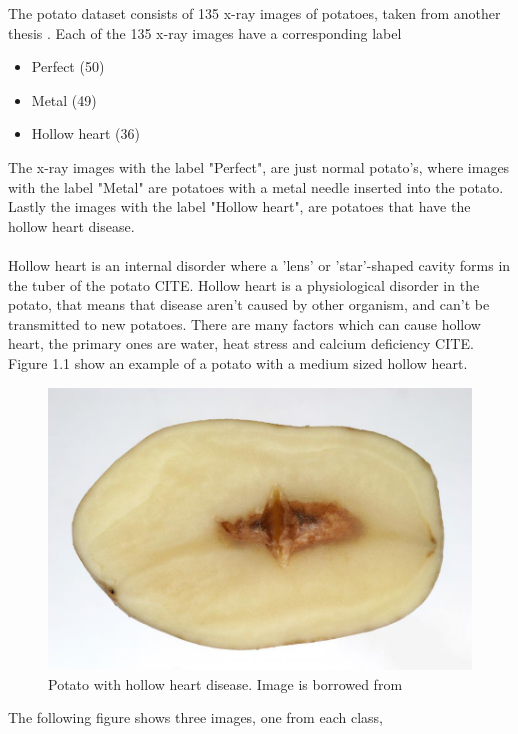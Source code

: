 \documentclass[11pt]{article}
\begin{document}
The potato dataset consists of 135 x-ray images of potatoes, taken from another thesis \cite{Online_Inspection_of_X-ray_Images}. Each of the 135 x-ray images have a corresponding label
\begin{itemize}
    \item Perfect (50)
    \item Metal (49)
    \item Hollow heart (36)
\end{itemize}
The x-ray images with the label "Perfect", are just normal potato's, where images with the label "Metal" are potatoes with a metal needle inserted into the potato. Lastly the images with the label "Hollow heart", are potatoes that have the hollow heart disease. 
\\ \\
Hollow heart is an internal disorder where a 'lens' or 'star'-shaped cavity forms in the tuber of the potato CITE. Hollow heart is a physiological disorder in the potato, that means that disease aren't caused by other organism, and can't be transmitted to new potatoes. 
There are many factors which can cause hollow heart, the primary ones are water, heat stress and calcium deficiency CITE. Figure 1.1 show an example of a potato with a medium sized hollow heart.
\begin{figure}[!h]\label{fig:hollow_heart}
    \centering
    \includegraphics[scale=0.2]{figurer/potato_experiment/Hollow_heart.jpg}
    \caption{Potato with hollow heart disease. Image is borrowed from }
\end{figure}

The following figure shows three images, one from each class,
\end{document}
